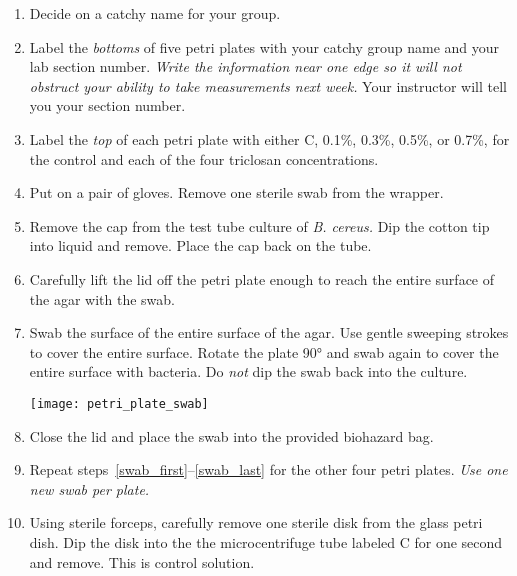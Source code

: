 \documentclass[12pt]{exam}
\begin{document}
\begin{questions}
	\begin{enumerate}
	
		\item Decide on a catchy name for your group. 
	
		\item Label the \emph{bottoms} of five petri plates with your catchy group name and your lab section number. \emph{Write the information near one edge so it will not obstruct your ability to take measurements next week.} Your instructor will tell you your section number.
		
		\item Label the \emph{top} of each petri plate with either C, 0.1\%, 0.3\%, 0.5\%, or 0.7\%, for the control and each of the four triclosan concentrations. 
		
		\item Put on a pair of gloves. \label{swab_first} Remove one sterile swab from the wrapper. 
		
		\item Remove the cap from the test tube culture of \textit{B. cereus.} Dip the cotton tip into liquid and remove. Place the cap back on the tube.
		
		\item Carefully lift the lid off the petri plate enough to reach the entire surface of the agar with the swab.
		
		\item Swab the surface of the entire surface of the agar. Use gentle sweeping strokes to cover the entire surface. Rotate the plate 90° and swab again to cover the entire surface with bacteria. Do \emph{not} dip the swab back into the culture.
		
		{\centering\texttt{[image: petri\_plate\_swab]}\par
		}
		
		\item \label{swab_last} Close the lid and place the swab into the provided biohazard bag.
		
		\item Repeat steps~\ref{swab_first}–\ref{swab_last} for the other four petri plates. \emph{Use one new swab per plate.}
		
		\item \label{disk_first} Using sterile forceps, carefully remove one sterile disk from the glass petri dish. Dip the disk into the the microcentrifuge tube labeled C for one second and remove. This is control solution.
		

\end{enumerate}
\end{questions}
\end{document}
